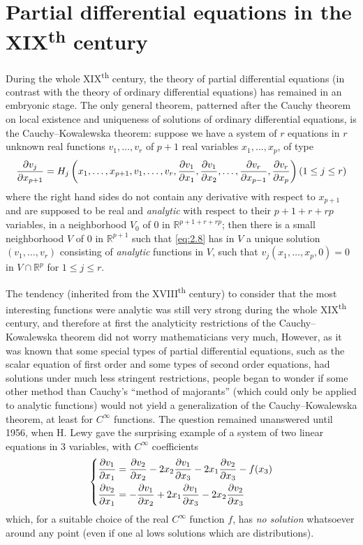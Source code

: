 \documentclass[12pt,a4paper,leqno,twoside]{extbook}
\newcommand{\supth}{\texorpdfstring{\textsuperscript{th}}{th}}
\newcommand{\R}{\mathbb{R}}
\newcommand{\pder}[2]{\frac{\partial #1}{\partial #2}}
\begin{document}
\section{Partial differential equations in the XIX\supth{} century}
\label{sec:2.2}

During the whole XIX\supth{} century, the theory of partial differential equations (in contrast with the theory of ordinary differential equations) has remained in an embryonic stage. The only general theorem, patterned after the Cauchy theorem on local existence and uniqueness of solutions of ordinary differential equations, is the Cauchy--Kowalewska theorem: suppose we have a system of \(r\) equations in \(r\) unknown real functions \(v_1, \ldots, v_r\) of \(p+1\) real variables \(x_1, \ldots, x_p\), of type
\begin{equation}
    \label{eq:2.8}
    \pder{v_j}{x_{p+1}} = H_j\left(x_1, \ldots, x_{p+1}, v_1, \ldots, v_{r}, \pder{v_1}{x_1}, \pder{v_1}{x_2}, \ldots, \pder{v_r}{x_{p-1}}, \pder{v_r}{x_p}\right) \hfill (1 \leq j \leq r)
\end{equation}
where the right hand sides do not contain any derivative with respect to \(x_{p+1}\) and are supposed to be real and \emph{analytic} with respect to their \(p+1+r+rp\) variables, in a neighborhood \(V_0\) of 0 in \(\R^{p+1+r+rp}\); then there is a small neighborhood \(V\) of 0 in \(\R^{p+1}\) such that \eqref{eq:2.8} has in \(V\) a unique solution \((v_1,\ldots,v_r)\) consisting of \emph{analytic} functions in \(V\), such that \(v_j(x_1,\ldots,x_p,0) = 0\) in \(V \cap \R^p\) for \(1 \leq j \leq r\).

The tendency (inherited from the XVIII\supth{} century) to consider that the most interesting functions were analytic was still very strong during the whole XIX\supth{} century, and therefore at first the analyticity restrictions of the Cauchy--Kowalewska theorem did not worry mathematicians very much, However, as it was known that some special types of partial differential equations, such as the scalar equation of first order and some types of second order equations, had solutions under much less stringent restrictions, people began to wonder if some other method than Cauchy's ``method of majorants'' (which could only be applied to analytic functions) would not yield a generalization of the Cauchy--Kowalewska theorem, at least for \(C^\infty\) functions. The question remained unanswered until 1956, when H. Lewy gave the surprising example of a system of two linear equations in 3 variables, with \(C^\infty\) coefficients
\[
  \begin{dcases}
    \pder{v_1}{x_1} = \pder{v_2}{x_2} - 2 x_2 \pder{v_1}{x_3} - 2x_1 \pder{v_2}{x_3} - f(x_3) \\
    \pder{v_2}{x_1} = -\pder{v_1}{x_2} + 2 x_1 \pder{v_1}{x_3} - 2x_2 \pder{v_2}{x_3}
  \end{dcases}
\]
which, for a suitable choice of the real \(C^\infty\) function \(f\), has \emph{no solution} whatsoever around any point (even if one al lows solutions which are distributions).
\end{document}
